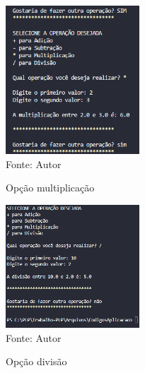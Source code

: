 	\begin{figure}[H]
		\begin{center}
			\caption{Opção multiplicação} \label{ling1}
			\includegraphics[width=5cm]{multi.PNG} \\
			{\tiny \sf Fonte:{ Autor}}
		\end{center}
	\end{figure}
	
	\begin{figure}[H]
		\begin{center}
			\caption{Opção divisão} \label{ling1}
			\includegraphics[width=5cm]{divisao.PNG} \\
			{\tiny \sf Fonte:{ Autor}}
		\end{center}
	\end{figure}
	
	
